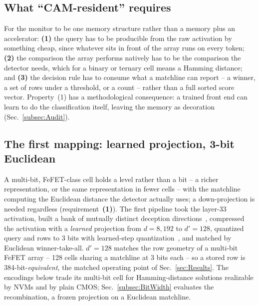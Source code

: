 \documentclass[conference]{IEEEtran}
\newcommand{\fefet}{{FeFET}\xspace}
\begin{document}
\subsection{What ``CAM-resident'' requires}
\label{subsec:Requirements}
For the monitor to be one memory structure rather than a memory plus
an accelerator: {\bf (1)} the query has to be producible from the
raw activation by something cheap, since whatever sits in front of
the array runs on every token; {\bf (2)} the comparison the array
performs natively has to be the comparison the detector needs, which
for a binary or ternary cell means a Hamming distance; and {\bf (3)}
the decision rule has to consume what a matchline can report -- a
winner, a set of rows under a threshold, or a count -- rather than a
full sorted score vector. Property~(1) has a methodological
consequence: a trained front end can learn to do the classification
itself, leaving the memory as decoration (Sec.~\ref{subsec:Audit}).

\subsection{The first mapping: learned projection, 3-bit Euclidean}
\label{subsec:FirstPipeline}
\label{subsec:PathBack}
A multi-bit, \fefet-class cell holds a level rather than a bit -- a
richer representation, or the same representation in fewer cells --
with the matchline computing the Euclidean distance the detector
actually uses; a down-projection is needed regardless
(requirement~{\bf (1)}). The first pipeline took the layer-33
activation, built a bank of mutually
distinct deception directions~\cite{ravfogel2020inlp}, compressed the
activation with a \emph{learned} projection from $d=8{,}192$ to
$d'=128$, quantized query and rows to 3 bits with learned-step
quantization~\cite{esser2020lsq}, and matched by Euclidean
winner-take-all. $d'=128$ matches the row
geometry of a multi-bit \fefet array -- 128 cells sharing a
matchline at 3 bits each -- so a stored row is
384-bit-\emph{equivalent}, the matched operating point of
Sec.~\ref{sec:Results}. The encodings below trade its
multi-bit cell for Hamming-distance solutions realizable by NVMs and
by plain CMOS; Sec.~\ref{subsec:BitWidth} evaluates the
recombination, a frozen projection on a Euclidean matchline.
\end{document}
